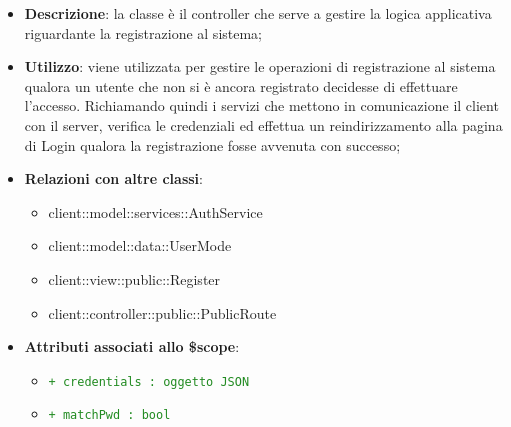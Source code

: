 			\begin{itemize}
				\item \textbf{Descrizione}: la classe è il controller che serve a gestire la logica applicativa riguardante la registrazione al sistema;
				\item \textbf{Utilizzo}: viene utilizzata per gestire le operazioni di registrazione al sistema qualora un utente che non si è ancora registrato decidesse di effettuare l'accesso. Richiamando quindi i servizi che mettono in comunicazione il client con il server, verifica le credenziali ed effettua un reindirizzamento alla pagina di Login qualora la registrazione fosse avvenuta con successo;
				\item \textbf{Relazioni con altre classi}:
					\begin{itemize}
						\item client::model::services::AuthService
						\item client::model::data::UserMode
						\item client::view::public::Register
						\item client::controller::public::PublicRoute
					\end{itemize}
				\item \textbf{Attributi associati allo \$scope}:
					\begin{itemize}
						\item \textcolor{forestgreen}{\texttt{+ credentials : oggetto JSON}}

						\item \textcolor{forestgreen}{\texttt{+ matchPwd : bool}} 


\end{itemize}
\end{itemize}
